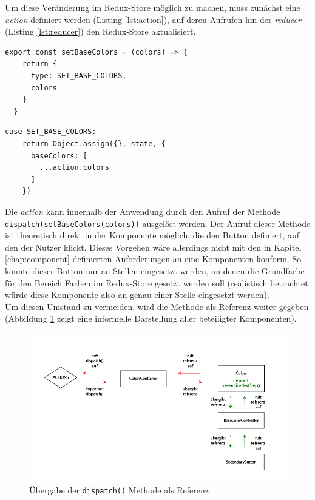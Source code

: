 Um diese Veränderung im Redux-Store möglich zu machen, muss zunächst eine \textit{action} definiert werden (Listing \ref{lst:action}), auf deren Aufrufen hin der \textit{reducer} (Listing \ref{lst:reducer}) den Redux-Store aktualisiert.


\begin{lstlisting}[caption={Definition der \textit{action} zum setzen der Grundfarben}, label=lst:action]
  export const setBaseColors = (colors) => {
    return {
      type: SET_BASE_COLORS,
      colors
    }
  }
\end{lstlisting}

\begin{lstlisting}[caption={Veränderung des Redux-Store beim Aufrauf der \textit{action} \texttt{setBaseColors}}, label=lst:reducer]
  case SET_BASE_COLORS:
    return Object.assign({}, state, {
      baseColors: [
        ...action.colors
      ]
    })
\end{lstlisting}

Die \textit{action} kann innerhalb der Anwendung durch den Aufruf der Methode \verb|dispatch(setBaseColors(colors))| ausgelöst werden. Der Aufruf dieser Methode ist theoretisch direkt in der Komponente möglich, die den Button definiert, auf den der Nutzer klickt. Dieses Vorgehen wäre allerdings nicht mit den in Kapitel \ref{chap:component} definierten Anforderungen an eine Komponenten konform. So könnte dieser Button nur an Stellen eingesetzt werden, an denen die Grundfarbe für den Bereich Farben im Redux-Store gesetzt werden soll (realistisch betrachtet würde diese Komponente also an genau einer Stelle eingesetzt werden).\\
Um diesen Umstand zu vermeiden, wird die Methode als Referenz weiter gegeben (Abbildung \ref{fig:redux_flow} zeigt eine informelle Darstellung aller beteiligter Komponenten).

\begin{figure}[h]
    \centering
    \includegraphics[width=1\textwidth]{images/redux_store_flow.png}
    \caption{Übergabe der \texttt{dispatch()} Methode als Referenz}
    \label{fig:redux_flow}
\end{figure}

